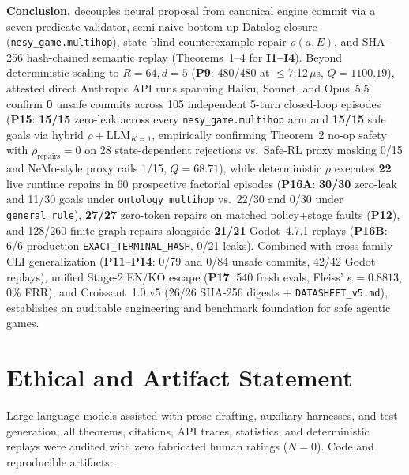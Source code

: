 \textbf{Conclusion.} \system{} decouples neural proposal from canonical engine commit via a seven-predicate validator, semi-naive bottom-up Datalog closure (\texttt{nesy\_game.multihop}), state-blind counterexample repair $\rho(a,E)$, and SHA-256 hash-chained semantic replay (Theorems~1--4 for \textbf{I1--I4}). Beyond deterministic scaling to $R{=}64, d{=}5$ (\textbf{P9}: 480/480 at $\le$7.12\,$\mu$s, $Q{=}1100.19$), attested direct Anthropic API runs spanning Haiku, Sonnet, and Opus~5.5 confirm \textbf{0} unsafe commits across 105 independent 5-turn closed-loop episodes (\textbf{P15}: \textbf{15/15} zero-leak across every \texttt{nesy\_game.multihop} arm and \textbf{15/15} safe goals via hybrid $\rho{+}\text{LLM}_{K=1}$, empirically confirming Theorem~2 no-op safety with $\rho_{\mathrm{repairs}}{=}0$ on 28 state-dependent rejections vs.\ Safe-RL proxy masking 0/15 and NeMo-style proxy rails 1/15, $Q{=}68.71$), while deterministic $\rho$ executes \textbf{22} live runtime repairs in 60 prospective factorial episodes (\textbf{P16A}: \textbf{30/30} zero-leak and 11/30 goals under \texttt{ontology\_multihop} vs.\ 22/30 and 0/30 under \texttt{general\_rule}), \textbf{27/27} zero-token repairs on matched policy+stage faults (\textbf{P12}), and 128/260 finite-graph repairs alongside \textbf{21/21} Godot~4.7.1 replays (\textbf{P16B}: 6/6 production \texttt{EXACT\_TERMINAL\_HASH}, 0/21 leaks). Combined with cross-family CLI generalization (\textbf{P11}--\textbf{P14}: 0/79 and 0/84 unsafe commits, 42/42 Godot replays), unified Stage-2 EN/KO escape (\textbf{P17}: 540 fresh evals, Fleiss' $\kappa{=}0.8813$, 0\% FRR), and Croissant~1.0 v5 (26/26 SHA-256 digests + \texttt{DATASHEET\_v5.md}), \system{} establishes an auditable engineering and benchmark foundation for safe agentic games.

\section*{Ethical and Artifact Statement}
Large language models assisted with prose drafting, auxiliary harnesses, and test generation; all theorems, citations, API traces, statistics, and deterministic replays were audited with zero fabricated human ratings ($N{=}0$). Code and reproducible artifacts: \RepoURL.
